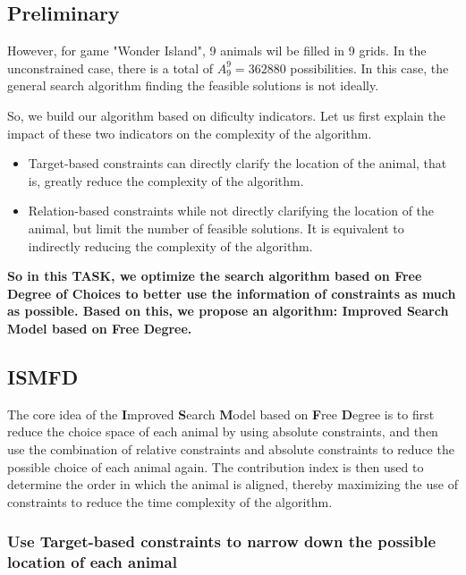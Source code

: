 \documentclass{mcmthesis}
\begin{document}
		\clearpage
	
		
		\subsection{Preliminary}
		
			However, for game "Wonder Island", 9 animals wil be filled in 9 grids. In the unconstrained case, there is a total of $A_9^9=362880$ possibilities. In this case, the general search algorithm finding the feasible solutions is not ideally.
		
			So, we build our algorithm based on dificulty indicators. Let us first explain the impact of these two indicators on the complexity of the algorithm.
			
			\begin{itemize}
				\item Target-based constraints can directly clarify the location of the animal, that is, greatly reduce the complexity of the algorithm.
				
				\item Relation-based constraints while not directly clarifying the location of the animal, but limit the number of feasible solutions. It is equivalent to indirectly reducing the complexity of the algorithm.
				
			\end{itemize}
			
			\textbf{So in this TASK, we optimize the search algorithm based on Free Degree of Choices to better use the information of constraints as much as possible. Based on this, we propose an algorithm: Improved Search Model based on Free Degree.} 
		
		\subsection{ISMFD}
		
			The core idea of the \textbf{I}mproved \textbf{S}earch \textbf{M}odel based on \textbf{F}ree \textbf{D}egree is to first reduce the choice space of each animal by using absolute constraints, and then use the combination of relative constraints and absolute constraints to reduce the possible choice of each animal again. The contribution index is then used to determine the order in which the animal is aligned, thereby maximizing the use of constraints to reduce the time complexity of the algorithm.
			
			
			
			\subsubsection{Use Target-based constraints to narrow down the possible location of each animal}
			
\end{document}
